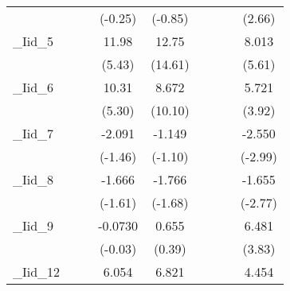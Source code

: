 {\begin{tabular}{l*{8}{c}}
            &                     &                     &     (-0.25)         &     (-0.85)         &                     &                     &                     &      (2.66)         \\
[1em]
\_Iid\_5      &                     &                     &       11.98\sym{***}&       12.75\sym{***}&                     &                     &                     &       8.013\sym{***}\\
            &                     &                     &      (5.43)         &     (14.61)         &                     &                     &                     &      (5.61)         \\
[1em]
\_Iid\_6      &                     &                     &       10.31\sym{***}&       8.672\sym{***}&                     &                     &                     &       5.721\sym{***}\\
            &                     &                     &      (5.30)         &     (10.10)         &                     &                     &                     &      (3.92)         \\
[1em]
\_Iid\_7      &                     &                     &      -2.091         &      -1.149         &                     &                     &                     &      -2.550\sym{**} \\
            &                     &                     &     (-1.46)         &     (-1.10)         &                     &                     &                     &     (-2.99)         \\
[1em]
\_Iid\_8      &                     &                     &      -1.666         &      -1.766         &                     &                     &                     &      -1.655\sym{**} \\
            &                     &                     &     (-1.61)         &     (-1.68)         &                     &                     &                     &     (-2.77)         \\
[1em]
\_Iid\_9      &                     &                     &     -0.0730         &       0.655         &                     &                     &                     &       6.481\sym{***}\\
            &                     &                     &     (-0.03)         &      (0.39)         &                     &                     &                     &      (3.83)         \\
[1em]
\_Iid\_12     &                     &                     &       6.054\sym{***}&       6.821\sym{***}&                     &                     &                     &       4.454\sym{**} \\

\end{tabular}}
